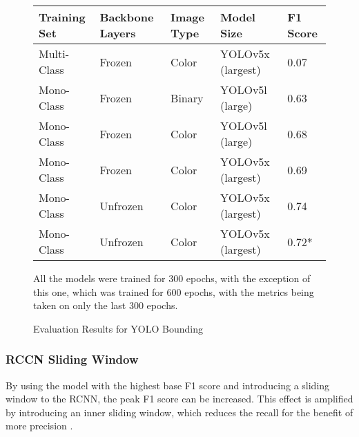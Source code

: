 \begin{figure}[H]
    \caption{Evaluation Results for YOLO Bounding}
    \label{fig:evalYOLORaw}
    \begin{center}
      \begin{tabular}{ | l | l | l | l | l | }
          \hline
          Training Set & Backbone Layers & Image Type & Model Size & F1 Score \\
          \hline
          Multi-Class & Frozen & Color & YOLOv5x (largest) & 0.07 \\
          Mono-Class & Frozen & Binary & YOLOv5l (large) & 0.63 \\
          Mono-Class & Frozen & Color & YOLOv5l (large) & 0.68 \\
          Mono-Class & Frozen & Color & YOLOv5x (largest) & 0.69 \\
          Mono-Class & Unfrozen & Color & YOLOv5x (largest) & 0.74 \\
          Mono-Class & Unfrozen & Color & YOLOv5x (largest) & 0.72* \\
          \hline
      \end{tabular}
    \end{center}
    \vspace{5mm}
    All the models were trained for 300 epochs, with the exception of this one, which was trained for 600 epochs, with the metrics being taken on only the last 300 epochs.
\end{figure}

\subsubsection{RCCN Sliding Window}

By using the model with the highest base F1 score and introducing a sliding window to the RCNN, the peak F1 score can be increased. This effect is amplified by introducing an inner sliding window, which reduces the recall for the benefit of more precision .

